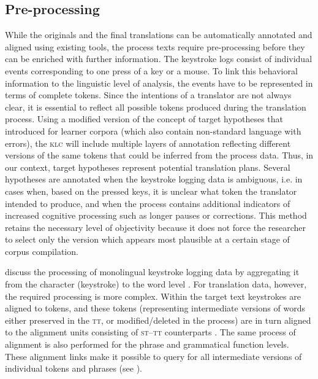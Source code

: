 \documentclass[output=paper]{LSP/langsci}
\begin{document}
\subsection{Pre-processing} \label{sec:1:2:2}
While the originals and the final translations can be automatically annotated and aligned using existing tools, the process texts require pre-processing before they can be enriched with further information. The keystroke logs consist of individual events corresponding to one press of a key or a mouse. To link this behavioral information to the linguistic level of analysis, the events have to be represented in terms of complete tokens. Since the intentions of a translator are not always clear, it is essential to reflect all possible tokens produced during the translation process. Using a modified version of the concept of target hypotheses that \citet{Lüdeling2008} introduced for learner corpora (which also contain non-standard language with errors), the \textsc{klc} will include multiple layers of annotation reflecting different versions of the same tokens that could be inferred from the process data. Thus, in our context, target hypotheses represent potential translation plans. Several hypotheses are annotated when the keystroke logging data is ambiguous, i.e. in cases when, based on the pressed keys, it is unclear what token the translator intended to produce, and when the process contains additional indicators of increased cognitive processing such as longer pauses or corrections. This method retains the necessary level of objectivity because it does not force the researcher to select only the version which appears most plausible at a certain stage of corpus compilation.

\citet{Leijten2012} discuss the processing of monolingual keystroke logging data by aggregating it from the character (keystroke) to the word level \citep[see also][]{Macken2012}. For translation data, however, the required processing is more complex. Within the target text keystrokes are aligned to tokens, and these tokens (representing intermediate versions of words either preserved in the \textsc{tt}, or modified/deleted in the process) are in turn aligned to the alignment units consisting of \textsc{st}--\textsc{tt} counterparts \citep[see][227]{Carl2009a}. The same process of alignment is also performed for the phrase and grammatical function levels. These alignment links make it possible to query for all intermediate versions of individual tokens and phrases (see ).
\end{document}
